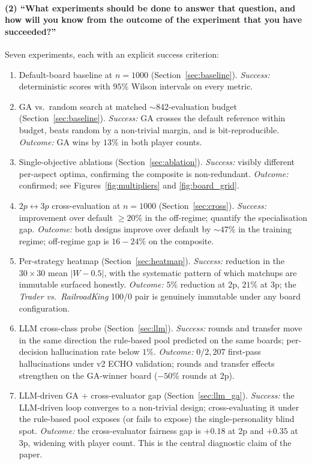 \documentclass[10pt]{article}
\begin{document}
\paragraph{(2) ``What experiments should be done to answer that
question, and how will you know from the outcome of the experiment
that you have succeeded?''}
Seven experiments, each with an explicit success criterion:
\begin{enumerate}[leftmargin=1.4em,itemsep=1pt]
\item Default-board baseline at $n{=}1000$
(Section~\ref{sec:baseline}). \emph{Success:} deterministic scores
with $95\%$ Wilson intervals on every metric.
\item GA vs.\ random search at matched $\sim$842-evaluation budget
(Section~\ref{sec:baseline}). \emph{Success:} GA crosses the
default reference within budget, beats random by a non-trivial
margin, and is bit-reproducible. \emph{Outcome:} GA wins by $13\%$
in both player counts.
\item Single-objective ablations (Section~\ref{sec:ablation}).
\emph{Success:} visibly different per-aspect optima, confirming the
composite is non-redundant. \emph{Outcome:} confirmed; see
Figures~\ref{fig:multipliers} and \ref{fig:board_grid}.
\item $2p\!\leftrightarrow\!3p$ cross-evaluation at $n{=}1000$
(Section~\ref{sec:cross}). \emph{Success:} improvement over default
$\geq 20\%$ in the off-regime; quantify the specialisation gap.
\emph{Outcome:} both designs improve over default by $\sim 47\%$ in
the training regime; off-regime gap is $16\!-\!24\%$ on the
composite.
\item Per-strategy heatmap (Section~\ref{sec:heatmap}).
\emph{Success:} reduction in the $30\times 30$ mean $|W-0.5|$, with
the systematic pattern of which matchups are immutable surfaced
honestly. \emph{Outcome:} $5\%$ reduction at 2p, $21\%$ at 3p; the
\textsl{Trader vs.\ RailroadKing} 100/0 pair is genuinely
immutable under any board configuration.
\item LLM cross-class probe (Section~\ref{sec:llm}). \emph{Success:}
rounds and transfer move in the same direction the rule-based pool
predicted on the same boards; per-decision hallucination rate below
$1\%$. \emph{Outcome:} $0/2{,}207$ first-pass hallucinations under
v2 ECHO validation; rounds and transfer effects strengthen on the
GA-winner board ($-50\%$ rounds at 2p).
\item LLM-driven GA + cross-evaluator gap
(Section~\ref{sec:llm_ga}). \emph{Success:} the LLM-driven loop
converges to a non-trivial design; cross-evaluating it under the
rule-based pool exposes (or fails to expose) the
single-personality blind spot. \emph{Outcome:} the cross-evaluator
fairness gap is $+0.18$ at 2p and $+0.35$ at 3p, widening with
player count. This is the central diagnostic claim of the paper.
\end{enumerate}



\end{document}
